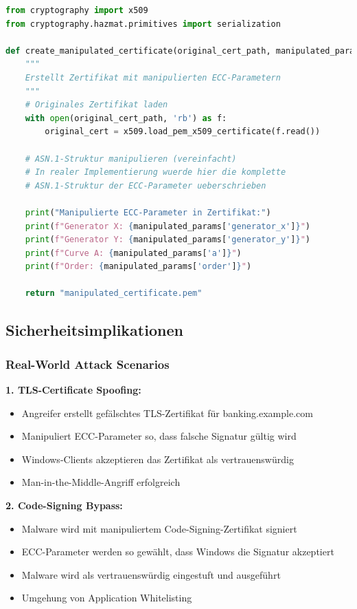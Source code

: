 \documentclass{article}
\begin{document}
\begin{lstlisting}[language=python, caption=Zertifikat-Parameter überschreiben]
from cryptography import x509
from cryptography.hazmat.primitives import serialization

def create_manipulated_certificate(original_cert_path, manipulated_params):
    """
    Erstellt Zertifikat mit manipulierten ECC-Parametern
    """
    # Originales Zertifikat laden
    with open(original_cert_path, 'rb') as f:
        original_cert = x509.load_pem_x509_certificate(f.read())
    
    # ASN.1-Struktur manipulieren (vereinfacht)
    # In realer Implementierung wuerde hier die komplette
    # ASN.1-Struktur der ECC-Parameter ueberschrieben
    
    print("Manipulierte ECC-Parameter in Zertifikat:")
    print(f"Generator X: {manipulated_params['generator_x']}")
    print(f"Generator Y: {manipulated_params['generator_y']}")
    print(f"Curve A: {manipulated_params['a']}")
    print(f"Order: {manipulated_params['order']}")
    
    return "manipulated_certificate.pem"
\end{lstlisting}

\subsection{Sicherheitsimplikationen}

\subsubsection{Real-World Attack Scenarios}

\textbf{1. TLS-Certificate Spoofing:}
\begin{itemize}
    \item Angreifer erstellt gefälschtes TLS-Zertifikat für banking.example.com
    \item Manipuliert ECC-Parameter so, dass falsche Signatur gültig wird
    \item Windows-Clients akzeptieren das Zertifikat als vertrauenswürdig
    \item Man-in-the-Middle-Angriff erfolgreich
\end{itemize}

\textbf{2. Code-Signing Bypass:}
\begin{itemize}
    \item Malware wird mit manipuliertem Code-Signing-Zertifikat signiert  
    \item ECC-Parameter werden so gewählt, dass Windows die Signatur akzeptiert
    \item Malware wird als vertrauenswürdig eingestuft und ausgeführt
    \item Umgehung von Application Whitelisting
\end{itemize}
\end{document}
